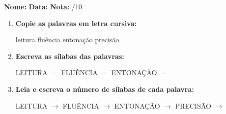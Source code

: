 \begin{exercicio}



\noindent\textbf{Nome:} \underline{\hspace{3.2cm}} \quad \textbf{Data:} \underline{\hspace{1.6cm}} \quad \textbf{Nota:} \underline{\hspace{0.9cm}}/10


\begin{enumerate}

  \item \textbf{Copie as palavras em letra cursiva:}
  \begin{center}
  leitura \quad fluência \quad entonação \quad precisão
  \end{center}
  \begin{center}
  \underline{\hspace{2.4cm}} \quad \underline{\hspace{2.4cm}} \quad \underline{\hspace{2.4cm}} \quad \underline{\hspace{2.4cm}}
  \end{center}

  \item \textbf{Escreva as sílabas das palavras:}
  \begin{center}
  LEITURA $=$ \underline{\hspace{1.5cm}} \underline{\hspace{1.5cm}} \quad FLUÊNCIA $=$ \underline{\hspace{1.5cm}} \underline{\hspace{1.5cm}} \quad ENTONAÇÃO $=$ \underline{\hspace{1.5cm}} \underline{\hspace{1.5cm}}
  \end{center}

  \item \textbf{Leia e escreva o número de sílabas de cada palavra:}
  \begin{center}
  LEITURA $\rightarrow$ \underline{\hspace{0.9cm}} \quad FLUÊNCIA $\rightarrow$ \underline{\hspace{0.9cm}} \quad ENTONAÇÃO $\rightarrow$ \underline{\hspace{0.9cm}} \quad PRECISÃO $\rightarrow$ \underline{\hspace{0.9cm}}
  \end{center}


\end{enumerate}
\end{exercicio}
